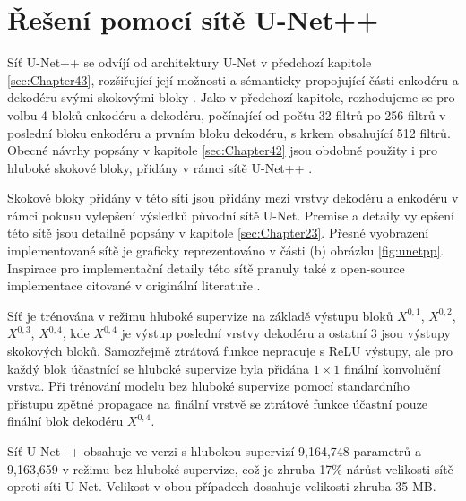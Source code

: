 \section{Řešení pomocí sítě U-Net++}
\label{sec:Chapter44}
Síť U-Net++ se odvíjí od architektury U-Net v předchozí kapitole \ref{sec:Chapter43}, rozšiřující její možnosti a sémanticky propojující části enkodéru a dekodéru svými skokovými bloky \cite{unetpp}. Jako v předchozí kapitole, rozhodujeme se pro volbu 4 bloků enkodéru a dekodéru, počínající od počtu 32 filtrů po 256 filtrů v poslední bloku enkodéru a prvním bloku dekodéru, s krkem obsahující 512 filtrů. Obecné návrhy popsány v kapitole \ref{sec:Chapter42} jsou obdobně použity i pro hluboké skokové bloky, přidány v rámci sítě U-Net++ \cite{unetpp}.

Skokové bloky přidány v této síti jsou přidány mezi vrstvy dekodéru a enkodéru v rámci pokusu vylepšení výsledků původní sítě U-Net. Premise a detaily vylepšení této sítě jsou detailně popsány v kapitole \ref{sec:Chapter23}. Přesné vyobrazení implementované sítě je graficky reprezentováno v části (b) obrázku \ref{fig:unetpp}. Inspirace pro implementační detaily této sítě pranuly také z open-source implementace citované v originální literatuře \cite{unetpp_github}.

Síť je trénována v režimu hluboké supervize na základě výstupu bloků $X^{0,1}$, $X^{0,2}$, $X^{0,3}$, $X^{0,4}$, kde $X^{0,4}$ je výstup poslední vrstvy dekodéru a ostatní 3 jsou výstupy skokových bloků. Samozřejmě ztrátová funkce nepracuje s ReLU výstupy, ale pro každý blok účastnící se hluboké supervize byla přidána $1\times1$ finální konvoluční vrstva. Při trénování modelu bez hluboké supervize pomocí standardního přístupu zpětné propagace na finální vrstvě se ztrátové funkce účastní pouze finální blok dekodéru $X^{0, 4}$.

Síť U-Net++ obsahuje ve verzi s hlubokou supervizí 9,164,748 parametrů a 9,163,659 v režimu bez hluboké supervize, což je zhruba 17\% nárůst velikosti sítě oproti síti U-Net. Velikost v obou případech dosahuje velikosti zhruba 35 MB.
\endinput